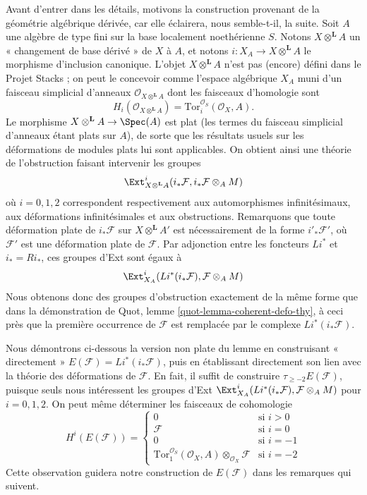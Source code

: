 \medskip\noindent
Avant d'entrer dans les détails, motivons la construction provenant de la
géométrie algébrique dérivée, car elle éclairera, nous semble-t-il, la suite.
Soit $A$ une algèbre de type fini sur la base localement noethérienne $S$.
Notons $X \otimes^\mathbf{L} A$ un « changement de base dérivé » de $X$ à
$A$, et notons $i : X_A \to X \otimes^\mathbf{L} A$ le morphisme d'inclusion
canonique. L'objet $X \otimes^\mathbf{L} A$ n'est pas (encore) défini dans le
Projet Stacks ; on peut le concevoir comme l'espace algébrique $X_A$ muni d'un
faisceau simplicial d'anneaux
$\mathcal{O}_{X \otimes^\mathbf{L} A}$ dont les faisceaux d'homologie sont
$$
H_i(\mathcal{O}_{X \otimes^\mathbf{L} A}) =
\text{Tor}^{\mathcal{O}_S}_i(\mathcal{O}_X, A).
$$
Le morphisme $X \otimes^\mathbf{L} A \to \Spec(A)$ est plat
(les termes du faisceau simplicial d'anneaux étant plats sur $A$),
de sorte que les résultats usuels sur les déformations de modules plats lui
sont applicables. On obtient ainsi une théorie de l'obstruction faisant
intervenir les groupes
$$
\Ext^i_{X \otimes^\mathbf{L} A}(i_*\mathcal{F},
i_*\mathcal{F} \otimes_A M)
$$
où $i = 0, 1, 2$ correspondent respectivement aux automorphismes
infinitésimaux, aux déformations infinitésimales et aux obstructions.
Remarquons que toute déformation plate de $i_*\mathcal{F}$ sur
$X \otimes^\mathbf{L} A'$ est nécessairement de la forme
$i'_*\mathcal{F}'$, où $\mathcal{F}'$ est une déformation plate de
$\mathcal{F}$. Par adjonction entre les foncteurs $Li^*$ et
$i_* = Ri_*$, ces groupes d'Ext sont égaux à
$$
\Ext^i_{X_A}(Li^*(i_*\mathcal{F}), \mathcal{F} \otimes_A M)
$$
Nous obtenons donc des groupes d'obstruction exactement de la même forme que
dans la démonstration de Quot, lemme \ref{quot-lemma-coherent-defo-thy},
à ceci près que la première occurrence de $\mathcal{F}$ est remplacée par le
complexe $Li^*(i_*\mathcal{F})$.

\medskip\noindent
Nous démontrons ci-dessous la version non plate du lemme en construisant
« directement » $E(\mathcal{F}) = Li^*(i_*\mathcal{F})$, puis en établissant
directement son lien avec la théorie des déformations de $\mathcal{F}$.
En fait, il suffit de construire $\tau_{\geq -2}E(\mathcal{F})$, puisque seuls
nous intéressent les groupes d'Ext
$\Ext^i_{X_A}(Li^*(i_*\mathcal{F}), \mathcal{F} \otimes_A M)$
pour $i = 0, 1, 2$. On peut même déterminer les faisceaux de cohomologie
$$
H^i(E(\mathcal{F})) =
\left\{
\begin{matrix}
0 & \text{si }i > 0 \\
\mathcal{F} & \text{si } i = 0 \\
0 & \text{si } i = -1 \\
\text{Tor}_1^{\mathcal{O}_S}(\mathcal{O}_X, A)
\otimes_{\mathcal{O}_X} \mathcal{F} &
\text{si } i = -2
\end{matrix}
\right.
$$
Cette observation guidera notre construction de $E(\mathcal{F})$ dans les
remarques qui suivent.

